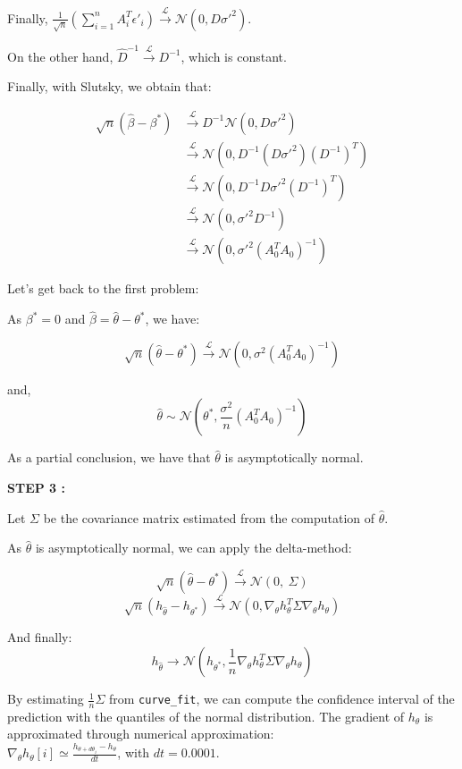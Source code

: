 Finally, $\frac{1}{\sqrt{n}} \left( \sum_{i=1}^{n}  A_i^T \epsilon'_i \right) \xrightarrow{\mathcal{L}} \mathcal{N}(0, D \sigma'^{2})$. 

On the other hand, $\hat{D}^{-1} \xrightarrow{\mathcal{L}} D^{-1} $, which is constant.

Finally, with Slutsky, we obtain that: 

\begin{align*}
    \sqrt{n} (\hat{\beta} - \beta^*) &\xrightarrow{\mathcal{L}} D^{-1}\mathcal{N}(0, D \sigma'^2) \\
    &\xrightarrow{\mathcal{L}} \mathcal{N}(0, D^{-1} (D \sigma'^2) (D^{-1})^T) \\
    &\xrightarrow{\mathcal{L}} \mathcal{N}(0, D^{-1} D \sigma'^2 (D^{-1})^{T}) \\
    &\xrightarrow{\mathcal{L}} \mathcal{N}(0, \sigma'^2 D^{-1}) \\
    &\xrightarrow{\mathcal{L}} \mathcal{N}(0, \sigma'^2 (A_0^T A_0)^{-1})
\end{align*}


Let's get back to the first problem: 

As $\beta ^* = 0 $ and $\hat{\beta} = \hat{\theta} - \theta ^* $, we have: 

\[
\sqrt{n} (\hat{\theta} - \theta^*) \xrightarrow{\mathcal{L}} \mathcal{N}(0, \sigma^2 (A_0^T A_0)^{-1})
\]

and, 
\[
\hat{\theta} \sim \mathcal{N}(\theta^*, \frac{\sigma^2}{n} (A_0^T A_0)^{-1})
\]

As a partial conclusion, we have that $\hat{\theta}$ is asymptotically normal.



\textbf{STEP 3 :}\\
\label{step:step3}


Let $\Sigma$ be the covariance matrix estimated from the computation of $\hat{\theta}$. 

As $\hat{\theta}$ is asymptotically normal, we can apply the delta-method: 

\[
\sqrt{n} (\hat{\theta} -\theta^*) \xrightarrow{\mathcal{L}} \mathcal{N}(0, \ \Sigma)
\]
\[
\sqrt{n} (h_{\hat{\theta}} -h_{\theta^*}) \xrightarrow{\mathcal{L}} \mathcal{N}(0, \nabla_\theta h_\theta ^T \Sigma  \nabla_\theta h_\theta)
\]

And finally: 
\[
h_{\hat{\theta}} \rightarrow \mathcal{N}(h_{\theta^*}, \frac{1}{n}\nabla_\theta h_\theta ^T \Sigma  \nabla_\theta h_\theta)
\]

By estimating $\frac{1}{n} \Sigma$ from \texttt{curve\_fit}, we can compute the confidence interval of the prediction with the quantiles of the normal distribution.
The gradient of $h_\theta$ is approximated through numerical approximation: \\
$\nabla_\theta h_\theta [i] \simeq \frac{h_{\theta + d \theta _ i  } - h_\theta}{dt}$, with $dt=0.0001$. \\

